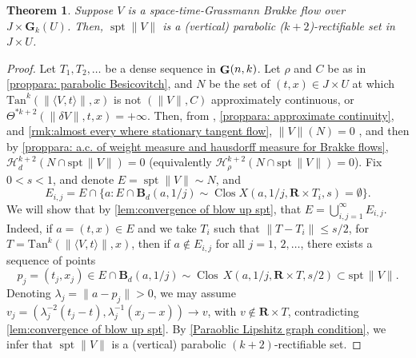 \documentclass{article}
\theoremstyle{plain}
\newtheorem{theorem}{Theorem}[section]
\theoremstyle{definition}
\theoremstyle{plain}
\theoremstyle{remark}
\theoremstyle{remark}
\theoremstyle{plain}
\DeclareMathOperator{\G}{{\bf G}}
\DeclareMathOperator{\spt}{spt}
\DeclareMathOperator*{\Clos}{Clos}
\begin{document}
\begin{theorem}
\label{thm:rectifiability of Brakke flow}
    Suppose $V$ is a space-time-Grassmann Brakke flow over $J\times \mathbf{G}_{k} (U)$.
    Then, $\spt \|V\|$ is a (vertical) parabolic ($k+2$)-rectifiable set in $J \times U$.
\end{theorem}

\begin{proof}

Let $T_1,T_2,\dots$ be a dense sequence in $\G(n,k)$.
Let $\rho$ and $C$ be as in \ref{proppara: parabolic Besicovitch}, and $N$ be the set of $(t,x) \in J \times U$ at which $\mathrm{Tan}^{k} (\| \langle V, t \rangle \|, x)$ is not $(\|V\|,C)$ approximately continuous, or $\Theta^{* k + 2} (\| \delta V \|, t, x) = + \infty$. 
Then, from \cite[Theorem C]{LW-Space-Time-GrassmannMeasureBrakkeFlow}, \ref{proppara: approximate continuity}, and \ref{rmk:almost every where stationary tangent flow}, $\|V\|(N) = 0$ , and then by \ref{proppara: a.c. of weight measure and hausdorff measure for Brakke flows}, $\mathscr H^{k+2}_{d}(N \cap \mathrm{spt} \, \| V \|) = 0$ (equivalently $\mathscr{H}^{k+2}_{\rho} (N \cap \mathrm{spt} \, \| V \|) = 0$).
    Fix $0 < s < 1$, and denote $E = \spt \|V\| \sim N$, and
    \[ E_{i, j} = E \cap  \{  a : E \cap \mathbf{B}_{d} (a, 1 / j)\sim  \Clos X(a,1 / j, \mathbf{R} \times T_{i} ,s) = \emptyset  \}.\]
    We will show that by \ref{lem:convergence of blow up spt}, that $E = \bigcup_{i, j=1}^\infty E_{i, j}$.
    Indeed, if $a = (t, x)\in E$ and we take $T_{i}$ such that $\| T - T_{i}\| \leq s / 2$, for $T = \mathrm{Tan}^{k} (\| \langle V, t \rangle \|, x)$, then if $a \not\in E_{i, j}$ for all $j = 1, \, 2, \ldots$, there exists a sequence of points 
    \begin{equation*}
        p_{j} = (t_{j}, x_{j}) \in E \cap \mathbf{B}_{d} (a, 1 / j) \sim \Clos \, X (a, 1 / j, \mathbf{R} \times T, s / 2) \subset \mathrm{spt} \, \| V \|.
    \end{equation*} 
    Denoting $\lambda_{j} = \| a - p_{j} \| > 0$, we may assume $v_{j} = (\lambda_{j}^{-2} (t_{j} - t), \lambda_{j}^{-1} (x_{j} - x)) \rightarrow v$, with $v \notin \mathbf{R} \times T$, contradicting \ref{lem:convergence of blow up spt}.
    By \ref{Paraoblic Lipshitz graph condition}, 
    we infer that $\spt \|V\|$ is a (vertical) parabolic $(k + 2)$-rectifiable set.
\end{proof}
\end{document}
